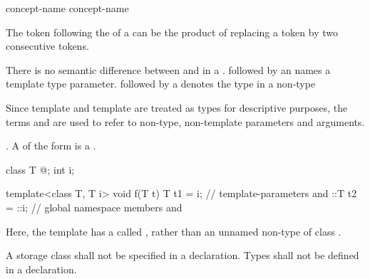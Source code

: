 \begin{bnf}
\br
  \br
\end{bnf}

\begin{bnf}
\br
   concept-name\br
   concept-name \terminal{<}  \terminal{>}
\end{bnf}

\begin{note}
The \tcode{>} token following the
 of a
can be the product of replacing a
\tcode{>>} token by two consecutive \tcode{>}
tokens.
\end{note}

\pnum
There is no semantic difference between
and
in a
.
followed by an
names a template type parameter.
followed by a
denotes the type in a non-type
\begin{footnote}
Since template
and template
are treated as types for descriptive purposes, the terms
and
are used to refer to non-type, non-template parameters and arguments.
\end{footnote}
.
A  of the form
  is a .
\begin{example}
\begin{codeblock}
class T { @\commentellip@ };
int i;

template<class T, T i> void f(T t) {
  T t1 = i;         // template-parameters  and 
  ::T t2 = ::i;     // global namespace members  and 
}
\end{codeblock}
Here, the template  has a 
called , rather than an unnamed non-type
 of class .
\end{example}
A storage class shall not be specified in a
declaration.
Types shall not be defined in a 
declaration.

